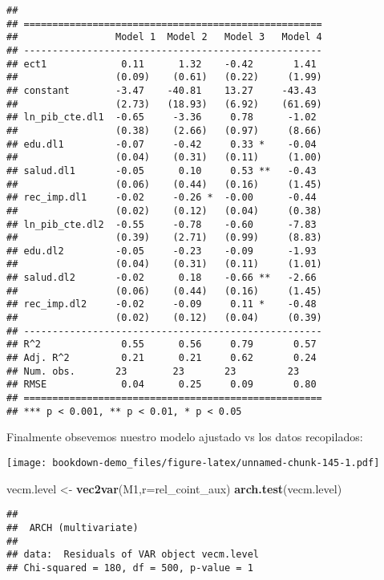 \documentclass[]{book}
\newenvironment{Shaded}{\begin{snugshade}}{\end{snugshade}}
\newcommand{\KeywordTok}[1]{\textcolor[rgb]{0.13,0.29,0.53}{\textbf{#1}}}
\newcommand{\DataTypeTok}[1]{\textcolor[rgb]{0.13,0.29,0.53}{#1}}
\newcommand{\StringTok}[1]{\textcolor[rgb]{0.31,0.60,0.02}{#1}}
\newcommand{\NormalTok}[1]{#1}
\theoremstyle{definition}
\theoremstyle{definition}
\theoremstyle{definition}
\theoremstyle{remark}
\begin{document}
\begin{verbatim}
## 
## ====================================================
##                 Model 1  Model 2   Model 3   Model 4
## ----------------------------------------------------
## ect1             0.11      1.32    -0.42       1.41 
##                 (0.09)    (0.61)   (0.22)     (1.99)
## constant        -3.47    -40.81    13.27     -43.43 
##                 (2.73)   (18.93)   (6.92)    (61.69)
## ln_pib_cte.dl1  -0.65     -3.36     0.78      -1.02 
##                 (0.38)    (2.66)   (0.97)     (8.66)
## edu.dl1         -0.07     -0.42     0.33 *    -0.04 
##                 (0.04)    (0.31)   (0.11)     (1.00)
## salud.dl1       -0.05      0.10     0.53 **   -0.43 
##                 (0.06)    (0.44)   (0.16)     (1.45)
## rec_imp.dl1     -0.02     -0.26 *  -0.00      -0.44 
##                 (0.02)    (0.12)   (0.04)     (0.38)
## ln_pib_cte.dl2  -0.55     -0.78    -0.60      -7.83 
##                 (0.39)    (2.71)   (0.99)     (8.83)
## edu.dl2         -0.05     -0.23    -0.09      -1.93 
##                 (0.04)    (0.31)   (0.11)     (1.01)
## salud.dl2       -0.02      0.18    -0.66 **   -2.66 
##                 (0.06)    (0.44)   (0.16)     (1.45)
## rec_imp.dl2     -0.02     -0.09     0.11 *    -0.48 
##                 (0.02)    (0.12)   (0.04)     (0.39)
## ----------------------------------------------------
## R^2              0.55      0.56     0.79       0.57 
## Adj. R^2         0.21      0.21     0.62       0.24 
## Num. obs.       23        23       23         23    
## RMSE             0.04      0.25     0.09       0.80 
## ====================================================
## *** p < 0.001, ** p < 0.01, * p < 0.05
\end{verbatim}

Finalmente obsevemos nuestro modelo ajustado vs los datos recopilados:

\texttt{[image: bookdown-demo\_files/figure-latex/unnamed-chunk-145-1.pdf]}

\begin{Shaded}
\begin{Highlighting}[]
\NormalTok{vecm.level <-}\StringTok{ }\KeywordTok{vec2var}\NormalTok{(M1,}\DataTypeTok{r=}\NormalTok{rel_coint_aux)}
\KeywordTok{arch.test}\NormalTok{(vecm.level)}
\end{Highlighting}
\end{Shaded}

\begin{verbatim}
## 
##  ARCH (multivariate)
## 
## data:  Residuals of VAR object vecm.level
## Chi-squared = 180, df = 500, p-value = 1
\end{verbatim}
\end{document}
